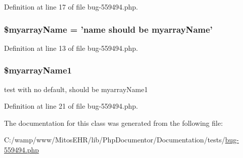 \-Definition at line 17 of file bug-\/559494.\-php.

\hypertarget{classtestarraybug_a4d70d28292a242d6a4152e6c62391f21}{
\subsubsection[{\$myarray\-Name}]{\setlength{\rightskip}{0pt plus 5cm}\$myarray\-Name = 'name should be myarray\-Name'}}\label{classtestarraybug_a4d70d28292a242d6a4152e6c62391f21}


\-Definition at line 13 of file bug-\/559494.\-php.

\hypertarget{classtestarraybug_a4290291905bf25ee1cd86d828d314ee4}{
\subsubsection[{\$myarray\-Name1}]{\setlength{\rightskip}{0pt plus 5cm}\$myarray\-Name1}}\label{classtestarraybug_a4290291905bf25ee1cd86d828d314ee4}
test with no default, should be myarray\-Name1 

\-Definition at line 21 of file bug-\/559494.\-php.



\-The documentation for this class was generated from the following file\-:\begin{DoxyCompactItemize}
\item 
\-C\-:/wamp/www/\-Mitos\-E\-H\-R/lib/\-Php\-Documentor/\-Documentation/tests/\hyperlink{bug-559494_8php}{bug-\/559494.\-php}\end{DoxyCompactItemize}
